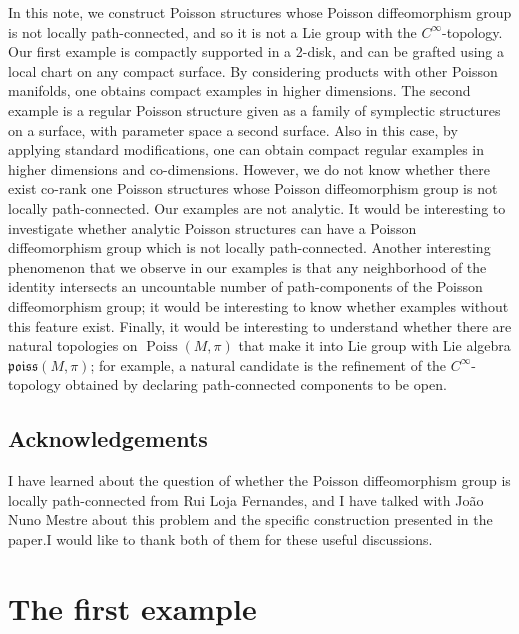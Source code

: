 \documentclass[10pt]{amsart}
\theoremstyle{definition}
\newcommand{\fkPoiss}{\mathfrak{poiss}}
\DeclareMathOperator{\Poiss}{Poiss}
\begin{document}
In this note, we construct Poisson structures whose Poisson diffeomorphism group is not locally path-connected, and so it is not a Lie group with the $C^{\infty}$-topology. Our first example is compactly supported in a 2-disk, and can be grafted using a local chart on any compact surface. By considering products with other Poisson manifolds, one obtains compact examples in higher dimensions. The second example is a regular Poisson structure given as a family of symplectic structures on a surface, with parameter space a second surface. Also in this case, by applying standard modifications, one can obtain compact regular examples in higher dimensions and co-dimensions. However, we do not know whether there exist co-rank one Poisson structures whose Poisson diffeomorphism group is not locally path-connected. Our examples are not analytic. It would be interesting to investigate whether analytic Poisson structures can have a Poisson diffeomorphism group which is not locally path-connected. Another interesting phenomenon that we observe in our examples is that any neighborhood of the identity intersects an uncountable number of path-components of the Poisson diffeomorphism group; it would be interesting to know whether examples without this feature exist. Finally, it would be interesting to understand whether there are natural topologies on $\Poiss(M,\pi)$ that make it into Lie group with Lie algebra $\fkPoiss(M,\pi)$; for example, a natural candidate is the refinement of the $C^{\infty}$-topology obtained by declaring path-connected components to be open.


\subsection*{Acknowledgements}
I have learned about the question of whether the Poisson diffeomorphism group is locally path-connected from Rui Loja Fernandes, and I have talked with João Nuno Mestre about this problem and the specific construction presented in the paper.\linebreak I would like to thank both of them for these useful discussions.


\section{The first example}
\end{document}
